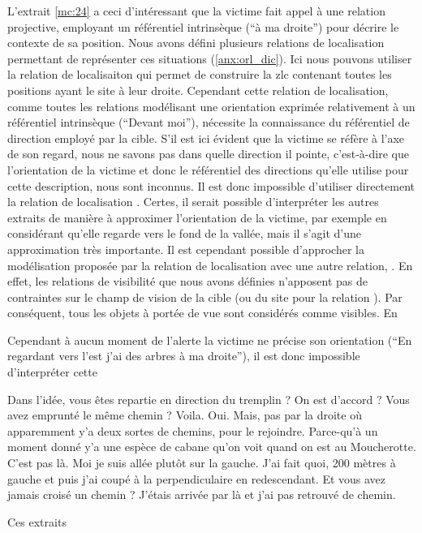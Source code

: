 L'extrait \ref{mc:24} a ceci d'intéressant que la victime fait appel à
une relation projective, employant un référentiel intrinsèque
(\enquote{à ma droite}) pour décrire le contexte de sa position. Nous
avons défini plusieurs relations de localisation permettant de
représenter ces situations (\autoref{anx:orl_dic}). Ici nous pouvons
utiliser la relation de localisaiton 
qui permet de construire la \ac{zlc} contenant toutes les positions
ayant le site à leur droite. Cependant cette relation de localisation,
comme toutes les relations modélisant une orientation exprimée
relativement à un référentiel intrinsèque (\eg \enquote{Devant moi}),
nécessite la connaissance du référentiel de direction employé par la
cible. S'il est ici évident que la victime se réfère à l'axe de son
regard, nous ne savons pas dans quelle direction il pointe,
c'est-à-dire que l'orientation de la victime et donc le référentiel
des directions qu'elle utilise pour cette description, nous sont
inconnus. Il est donc impossible d'utiliser directement la relation de
localisation . Certes, il serait
possible d'interpréter les autres extraits de manière à approximer
l'orientation de la victime, par exemple en considérant qu'elle
regarde vers le fond de la vallée, mais il s'agit d'une approximation
très importante. Il est cependant possible d'approcher la modélisation
proposée par la relation de localisation
 avec une autre relation,
. En effet, les relations de visibilité
que nous avons définies n'apposent pas de contraintes sur le champ de
vision de la cible (ou du site pour la relation
). Par conséquent, tous les objets à
portée de vue sont considérés comme visibles.
%
En

Cependant à aucun moment de l'alerte la
victime ne précise son orientation (\eg \enquote{En regardant vers
  l'est j'ai des arbres à ma droite}), il est donc impossible
d'interpréter cette 




\begin{dialogue*}
  \Sec {} Dans l’idée, vous êtes repartie en direction
  du tremplin ? On est d’accord ? Vous avez emprunté le même chemin ?
  \Req {} Voila. Oui.  Mais, pas par la
  droite où  apparemment y’a deux sortes de chemins,
  pour le rejoindre.  Parce-qu’à un moment donné y’a
  une espèce de cabane qu’on voit quand on est au Moucherotte. C’est
  pas là.  Moi je suis allée plutôt sur la
  gauche. J’ai fait quoi, 200 mètres à gauche et  puis
  j’ai coupé à la perpendiculaire en redescendant.
  \Sec {} Et vous avez jamais croisé un chemin ?
  \Req {} J’étais arrivée par là et j’ai pas retrouvé de
  chemin.
\end{dialogue*}
% 
Ces extraits

